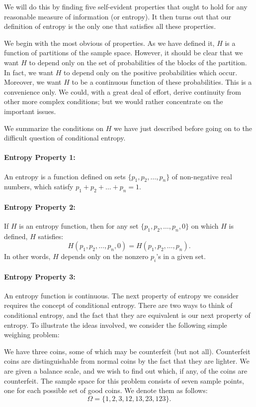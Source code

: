 \documentclass{report}
\begin{document}
We will do this by finding five self-evident properties that ought to hold for any reasonable measure of information (or entropy). It then turns out that our definition of entropy is the only one that satisfies all these properties.

We begin with the most obvious of properties. As we have defined it, \( H \) is a function of partitions of the sample space. However, it should be clear that we want \( H \) to depend only on the set of probabilities of the blocks of the partition. In fact, we want \( H \) to depend only on the positive probabilities which occur. Moreover, we want \( H \) to be a continuous function of these probabilities. This is a convenience only. We could, with a great deal of effort, derive continuity from other more complex conditions; but we would rather concentrate on the important issues. 

We summarize the conditions on \( H \) we have just described before going on to the difficult question of conditional entropy.

\paragraph{Entropy Property 1:} 
An entropy is a function defined on sets \( \{p_1, p_2, \ldots, p_n\} \) of non-negative real numbers, which satisfy \( p_1 + p_2 + \ldots + p_n = 1 \).

\paragraph{Entropy Property 2:} 
If \( H \) is an entropy function, then for any set \( \{p_1, p_2, \ldots, p_n, 0\} \) on which \( H \) is defined, \( H \) satisfies:
\[
H(p_1, p_2, \ldots, p_n, 0) = H(p_1, p_2, \ldots, p_n).
\]
In other words, \( H \) depends only on the nonzero \( p_i \)'s in a given set.

\paragraph{Entropy Property 3:} 
An entropy function is continuous.
The next property of entropy we consider requires the concept of conditional entropy. There are two ways to think of conditional entropy, and the fact that they are equivalent is our next property of entropy. To illustrate the ideas involved, we consider the following simple weighing problem:

We have three coins, some of which may be counterfeit (but not all). Counterfeit coins are distinguishable from normal coins by the fact that they are lighter. We are given a balance scale, and we wish to find out which, if any, of the coins are counterfeit. The sample space for this problem consists of seven sample points, one for each possible set of good coins. We denote them as follows:
\[
\Omega = \{1, 2, 3, 12, 13, 23, 123\}.
\]
\end{document}
